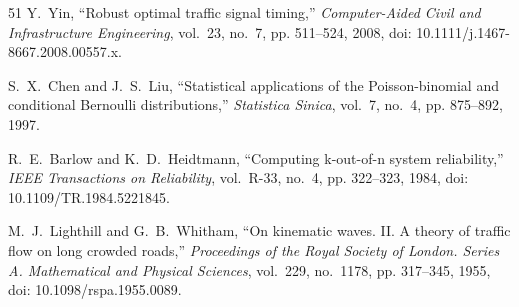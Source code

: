 \documentclass[journal,10pt,twocolumn]{IEEEtran}
\begin{document}
\begin{thebibliography}{51}
Y.~Yin, ``Robust optimal traffic signal timing,'' \emph{Computer-Aided Civil and Infrastructure Engineering}, vol.~23, no.~7, pp. 511--524, 2008, doi: 10.1111/j.1467-8667.2008.00557.x.

S.~X.~Chen and J.~S.~Liu, ``Statistical applications of the Poisson-binomial and conditional Bernoulli distributions,'' \emph{Statistica Sinica}, vol.~7, no.~4, pp. 875--892, 1997.

R.~E.~Barlow and K.~D.~Heidtmann, ``Computing k-out-of-n system reliability,'' \emph{IEEE Transactions on Reliability}, vol.~R-33, no.~4, pp. 322--323, 1984, doi: 10.1109/TR.1984.5221845.

M.~J.~Lighthill and G.~B.~Whitham, ``On kinematic waves. II. A theory of traffic flow on long crowded roads,'' \emph{Proceedings of the Royal Society of London. Series A. Mathematical and Physical Sciences}, vol.~229, no.~1178, pp. 317--345, 1955, doi: 10.1098/rspa.1955.0089.
\end{thebibliography}
\end{document}
